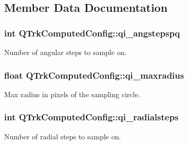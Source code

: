 \subsection{Member Data Documentation}
\subsubsection[{\texorpdfstring{qi\+\_\+angstepspq}{qi_angstepspq}}]{\setlength{\rightskip}{0pt plus 5cm}int Q\+Trk\+Computed\+Config\+::qi\+\_\+angstepspq}\hypertarget{struct_q_trk_computed_config_a1ba87257b24e5b7e427aa92dd4114792}{}\label{struct_q_trk_computed_config_a1ba87257b24e5b7e427aa92dd4114792}


Number of angular steps to sample on. 

\subsubsection[{\texorpdfstring{qi\+\_\+maxradius}{qi_maxradius}}]{\setlength{\rightskip}{0pt plus 5cm}float Q\+Trk\+Computed\+Config\+::qi\+\_\+maxradius}\hypertarget{struct_q_trk_computed_config_a9784dbeb638bde1f3204f9ca5af720c6}{}\label{struct_q_trk_computed_config_a9784dbeb638bde1f3204f9ca5af720c6}


Max radius in pixels of the sampling circle. 

\subsubsection[{\texorpdfstring{qi\+\_\+radialsteps}{qi_radialsteps}}]{\setlength{\rightskip}{0pt plus 5cm}int Q\+Trk\+Computed\+Config\+::qi\+\_\+radialsteps}\hypertarget{struct_q_trk_computed_config_ab1a11e7a567a3267c57f77626c6c9c93}{}\label{struct_q_trk_computed_config_ab1a11e7a567a3267c57f77626c6c9c93}


Number of radial steps to sample on. 

